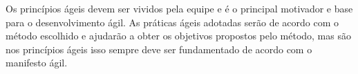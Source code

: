 Os princípios ágeis devem ser vividos pela equipe e é o principal motivador e base para o desenvolvimento ágil. As práticas ágeis adotadas serão de acordo com o método escolhido e ajudarão a obter os objetivos propostos pelo método, mas são nos princípios ágeis isso sempre deve ser fundamentado de acordo com o manifesto ágil.



